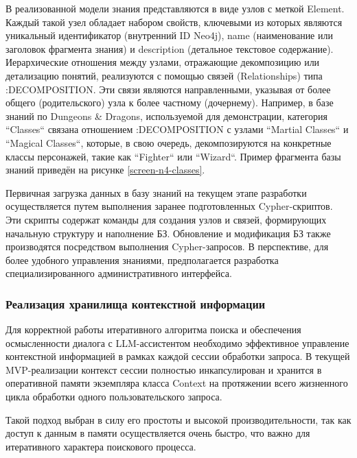 
В реализованной модели знания представляются в виде узлов с меткой Element. Каждый такой узел обладает набором свойств, ключевыми из которых являются уникальный идентификатор (внутренний ID Neo4j), name (наименование или заголовок фрагмента знания) и description (детальное текстовое содержание). Иерархические отношения между узлами, отражающие декомпозицию или детализацию понятий, реализуются с помощью связей (Relationships) типа :DECOMPOSITION. Эти связи являются направленными, указывая от более общего (родительского) узла к более частному (дочернему). Например, в базе знаний по Dungeons & Dragons, используемой для демонстрации, категория ``Classes`` связана отношением :DECOMPOSITION с узлами ``Martial Classes`` и ``Magical Classes``, которые, в свою очередь, декомпозируются на конкретные классы персонажей, такие как ``Fighter`` или ``Wizard``. Пример фрагмента базы знаний приведён на рисунке \ref{screen-n4-classes}.

Первичная загрузка данных в базу знаний на текущем этапе разработки осуществляется путем выполнения заранее подготовленных Cypher-скриптов. Эти скрипты содержат команды для создания узлов и связей, формирующих начальную структуру и наполнение БЗ. Обновление и модификация БЗ также производятся посредством выполнения Cypher-запросов. В перспективе, для более удобного управления знаниями, предполагается разработка специализированного административного интерфейса.

\subsubsection{Реализация хранилища контекстной информации}

Для корректной работы итеративного алгоритма поиска и обеспечения осмысленности диалога с LLM-ассистентом необходимо эффективное управление контекстной информацией в рамках каждой сессии обработки запроса. В текущей MVP-реализации контекст сессии полностью инкапсулирован и хранится в оперативной памяти экземпляра класса Context на протяжении всего жизненного цикла обработки одного пользовательского запроса.

Такой подход выбран в силу его простоты и высокой производительности, так как доступ к данным в памяти осуществляется очень быстро, что важно для итеративного характера поискового процесса.

